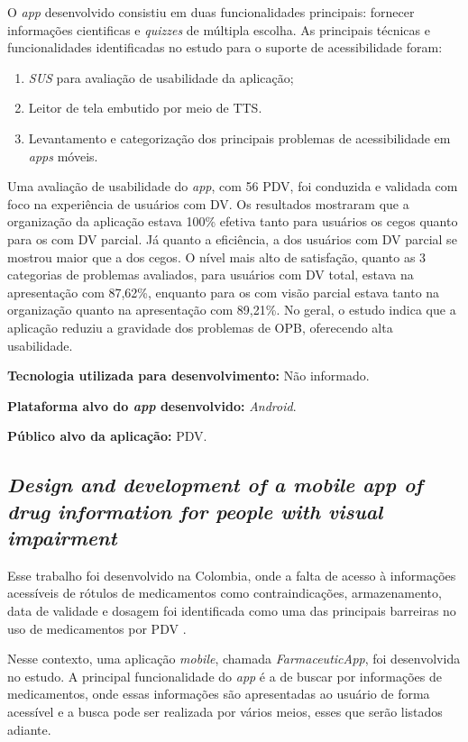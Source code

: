 O \emph{app} desenvolvido consistiu em duas funcionalidades principais: fornecer informações cientificas e \emph{quizzes} de múltipla escolha.
As principais técnicas e funcionalidades identificadas no estudo para o suporte de acessibilidade foram:

\begin{enumerate}
    \item \emph{SUS} para avaliação de usabilidade da aplicação;
    \item Leitor de tela embutido por meio de TTS\@.
    \item Levantamento e categorização dos principais problemas de acessibilidade em \emph{apps} móveis.
\end{enumerate}

Uma avaliação de usabilidade do \emph{app}, com 56 PDV, foi conduzida e validada com foco na experiência de usuários com DV\@.
Os resultados mostraram que a organização da aplicação estava 100\% efetiva tanto para usuários os cegos quanto para os com DV parcial.
Já quanto a eficiência, a dos usuários com DV parcial se mostrou maior que a dos cegos.
O nível mais alto de satisfação, quanto as 3 categorias de problemas avaliados, para usuários com DV total, estava na apresentação com 87,62\%, enquanto para os com visão parcial estava tanto na organização quanto na apresentação com 89,21\%.
No geral, o estudo indica que a aplicação reduziu a gravidade dos problemas de OPB, oferecendo alta usabilidade.

\textbf{Tecnologia utilizada para desenvolvimento:} Não informado.

\textbf{Plataforma alvo do \emph{app} desenvolvido:} \emph{Android}.

\textbf{Público alvo da aplicação:} PDV\@.

\subsection{\emph{Design and development of a mobile app of drug information for people with visual impairment}}

Esse trabalho foi desenvolvido na Colombia, onde a falta de acesso à informações acessíveis
de rótulos de medicamentos como contraindicações, armazenamento, data de validade e dosagem foi identificada como uma
das principais barreiras no uso de medicamentos por PDV \cite{Amariles2020}.

Nesse contexto, uma aplicação \emph{mobile}, chamada \emph{FarmaceuticApp}, foi desenvolvida no estudo.
A principal funcionalidade do \emph{app} é a de buscar por informações de medicamentos, onde essas informações são apresentadas ao usuário de forma acessível e a busca pode ser realizada por vários meios, esses que serão listados adiante.

